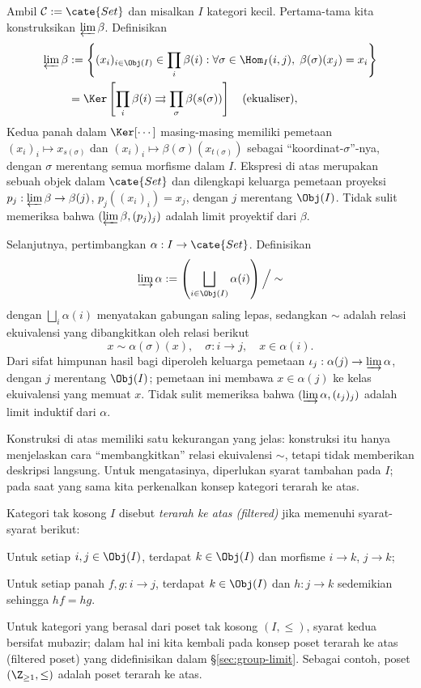 \begin{example}\label{eg:set-limits}
	Ambil $\mathcal{C} := \cate{Set}$ dan misalkan $I$ kategori kecil. Pertama-tama kita konstruksikan $\varprojlim \beta$. Definisikan
	\begin{align*}
		\varprojlim \beta & := \left\{ (x_i)_{i \in \Obj(I)} \in \prod_i \beta(i) : \forall \sigma \in \Hom_I(i,j), \; \beta(\sigma)(x_j) = x_i \right\} \\
		& = \Ker\left[ \prod_i \beta(i) \rightrightarrows \prod_\sigma \beta(s(\sigma)) \right] \quad \text{(ekualiser)},
	\end{align*}
	Kedua panah dalam $\Ker[\cdots]$ masing-masing memiliki pemetaan $(x_i)_i \mapsto x_{s(\sigma)}$ dan $(x_i)_i \mapsto \beta(\sigma)\left(x_{t(\sigma)}\right)$ sebagai ``koordinat-$\sigma$''-nya, dengan $\sigma$ merentang semua morfisme dalam $I$. Ekspresi di atas merupakan sebuah objek dalam $\cate{Set}$ dan dilengkapi keluarga pemetaan proyeksi $p_j: \varprojlim \beta \to \beta(j)$, $p_j((x_i)_i) = x_j$, dengan $j$ merentang $\Obj(I)$. Tidak sulit memeriksa bahwa $(\varprojlim \beta, (p_j)_j)$ adalah limit proyektif dari $\beta$.

	Selanjutnya, pertimbangkan $\alpha: I \to \cate{Set}$. Definisikan
	\[ \varinjlim \alpha := \left( \bigsqcup_{i \in \Obj(I)} \alpha(i) \right) \Big/ \sim \]
	dengan $\bigsqcup_i \alpha(i)$ menyatakan gabungan saling lepas, sedangkan $\sim$ adalah relasi ekuivalensi yang dibangkitkan oleh relasi berikut
	\[ x \sim \alpha(\sigma)(x), \quad \sigma: i \to j, \quad x \in \alpha(i). \]
	Dari sifat himpunan hasil bagi diperoleh keluarga pemetaan $\iota_j: \alpha(j) \to \varinjlim \alpha$, dengan $j$ merentang $\Obj(I)$; pemetaan ini membawa $x \in \alpha(j)$ ke kelas ekuivalensi yang memuat $x$. Tidak sulit memeriksa bahwa $(\varinjlim \alpha, (\iota_j)_j)$ adalah limit induktif dari $\alpha$.
\end{example}
Konstruksi di atas memiliki satu kekurangan yang jelas: konstruksi itu hanya menjelaskan cara ``membangkitkan'' relasi ekuivalensi $\sim$, tetapi tidak memberikan deskripsi langsung. Untuk mengatasinya, diperlukan syarat tambahan pada $I$; pada saat yang sama kita perkenalkan konsep kategori terarah ke atas.

\begin{definition}\label{def:filtrant-cat}
	Kategori tak kosong $I$ disebut \emph{terarah ke atas (filtered)} jika memenuhi syarat-syarat berikut:
	\begin{compactitem}
		\item Untuk setiap $i, j \in \Obj(I)$, terdapat $k \in \Obj(I)$ dan morfisme $i \to k$, $j \to k$;
		\item Untuk setiap panah $f,g: i \to j$, terdapat $k \in \Obj(I)$ dan $h: j \to k$ sedemikian sehingga $hf = hg$.
	\end{compactitem}
\end{definition}
Untuk kategori yang berasal dari poset tak kosong $(I, \leq)$, syarat kedua bersifat mubazir; dalam hal ini kita kembali pada konsep poset terarah ke atas (filtered poset) yang didefinisikan dalam \S\ref{sec:group-limit}. Sebagai contoh, poset $(\Z_{\geq 1}, \leq)$ adalah poset terarah ke atas.

